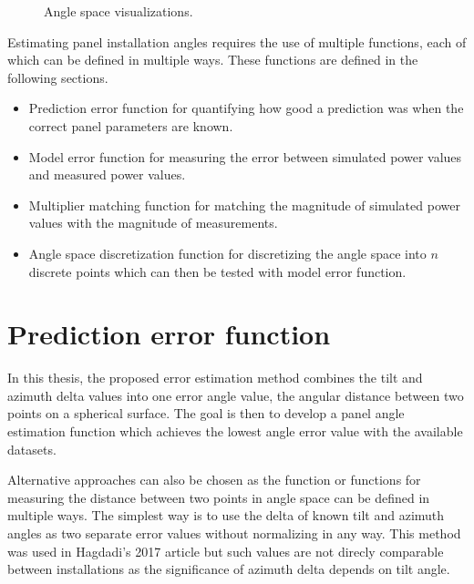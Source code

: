 \begin{figure}[h]
\begin{subfigure}[b]{0.35\textwidth}
         \label{fig_anglespace1}
     \end{subfigure}
     \hfill
     \caption{Angle space visualizations.}
     \label{fig_anglespace}
\end{figure}


\noindent Estimating panel installation angles requires the use of multiple functions, each of which can be defined in multiple ways. These functions are defined in the following sections.
\begin{itemize}
  \item Prediction error function for quantifying how good a prediction was when the correct panel parameters are known.
  \item Model error function for measuring the error between simulated power values and measured power values.
  \item Multiplier matching function for matching the magnitude of simulated power values with the magnitude of measurements.
  \item Angle space discretization function for discretizing the angle space into $n$ discrete points which can then be tested with model error function.
\end{itemize}




\section{Prediction error function}
In this thesis, the proposed error estimation method combines the tilt and azimuth delta values into one error angle value, the angular distance between two points on a spherical surface. The goal is then to develop a panel angle estimation function which achieves the lowest angle error value with the available datasets.

Alternative approaches can also be chosen as the function or functions for measuring the distance between two points in angle space can be defined in multiple ways. The simplest way is to use the delta of known tilt and azimuth angles as two separate error values without normalizing in any way. This method was used in Hagdadi's 2017 article but such values are not direcly comparable between installations as the significance of azimuth delta depends on tilt angle.

